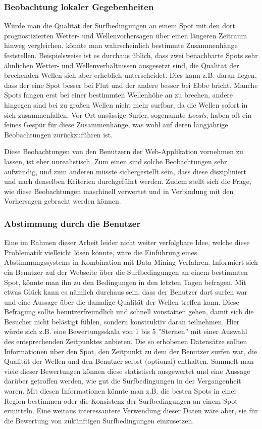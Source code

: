\subsubsection{Beobachtung lokaler Gegebenheiten}
Würde man die Qualität der Surfbedingungen an einem Spot mit den dort
prognostizierten Wetter- und Wellenvorhersagen über einen längeren
Zeitraum hinweg vergleichen, könnte man wahrscheinlich bestimmte
Zusammenhänge feststellen. Beispielsweise ist es durchaus üblich, dass
zwei benachbarte Spots sehr ähnlichen Wetter- und Wellenverhältnissen
ausgesetzt sind, die Qualität der brechenden Wellen sich aber
erheblich unterscheidet. Dies kann z.B. daran liegen, dass der eine
Spot besser bei Flut und der andere besser bei Ebbe bricht. Manche
Spots fangen erst bei einer bestimmten Wellenhöhe an zu brechen,
andere hingegen sind bei zu großen Wellen nicht mehr surfbar, da die
Wellen sofort in sich zusammenfallen. Vor Ort ansässige Surfer,
sogenannte \textit{Locals}, haben oft ein feines Gespür für diese
Zusammenhänge, was wohl auf deren langjährige Beobachtungen
zurückzuführen ist.

Diese Beobachtungen von den Benutzern der Web-Applikation vornehmen zu
lassen, ist eher unrealistisch. Zum einen sind solche Beobachtungen
sehr aufwändig, und zum anderen müsste sichergestellt sein, dass diese
diszipliniert und nach denselben Kriterien durchgeführt werden. Zudem
stellt sich die Frage, wie diese Beobachtungen maschinell verwertet
und in Verbindung mit den Vorhersagen gebracht werden können.

\subsubsection{Abstimmung durch die Benutzer}
Eine im Rahmen dieser Arbeit leider nicht weiter verfolgbare Idee,
welche diese Problematik vielleicht lösen könnte, wäre die Einführung
eines Abstimmungssystems in Kombination mit Data Mining
Verfahren. Informiert sich ein Benutzer auf der Webseite über die
Surfbedingungen an einem bestimmten Spot, könnte man ihn zu den
Bedingungen in den letzten Tagen befragen. Mit etwas Glück kann es
nämlich durchaus sein, dass der Benutzer dort surfen war und eine
Aussage über die damalige Qualität der Wellen treffen kann. Diese
Befragung sollte benutzerfreundlich und schnell vonstatten gehen,
damit sich die Besucher nicht belästigt fühlen, sondern konstruktiv
daran teilnehmen. Hier würde sich z.B. eine Bewertungsskala von 1 bis
5 ''Sternen'' mit einer Auswahl des entsprechenden Zeitpunktes
anbieten. Die so erhobenen Datensätze sollten Informationen über den
Spot, den Zeitpunkt zu dem der Benutzer surfen war, die Qualität der
Wellen und den Benutzer selbst (optional) enthalten. Sammelt man viele
dieser Bewertungen können diese statistisch ausgewertet und eine
Aussage darüber getroffen werden, wie gut die Surfbedingungen in der
Vergangenheit waren. Mit diesen Informationen könnte man z.B. die
besten Spots in einer Region bestimmen oder die Konsistenz der
Surfbedingungen an einem Spot ermitteln. Eine weitaus interessantere
Verwendung dieser Daten wäre aber, sie für die Bewertung von
zukünftigen Surfbedingungen einzusetzen.

